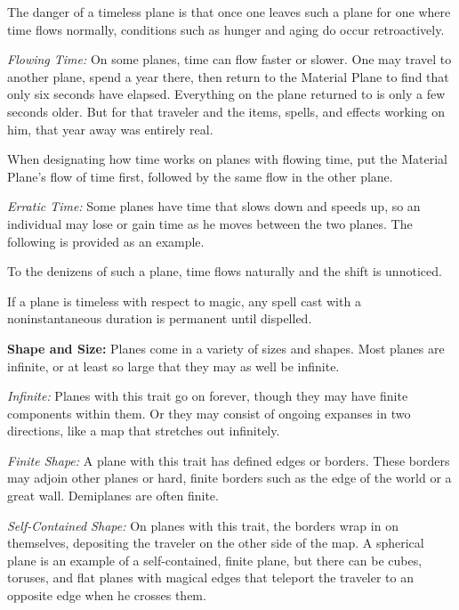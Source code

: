 The danger of a timeless plane is that once one leaves such a plane for one where time flows normally, conditions such as hunger and aging do occur retroactively.

\textit{Flowing Time:} On some planes, time can flow faster or slower. One may travel to another plane, spend a year there, then return to the Material Plane to find that only six seconds have elapsed. Everything on the plane returned to is only a few seconds older. But for that traveler and the items, spells, and effects working on him, that year away was entirely real.

When designating how time works on planes with flowing time, put the Material Plane's flow of time first, followed by the same flow in the other plane.

\textit{Erratic Time:} Some planes have time that slows down and speeds up, so an individual may lose or gain time as he moves between the two planes. The following is provided as an example.


To the denizens of such a plane, time flows naturally and the shift is unnoticed.

If a plane is timeless with respect to magic, any spell cast with a noninstantaneous duration is permanent until dispelled.

\textbf{Shape and Size:} Planes come in a variety of sizes and shapes. Most planes are infinite, or at least so large that they may as well be infinite.

\textit{Infinite:} Planes with this trait go on forever, though they may have finite components within them. Or they may consist of ongoing expanses in two directions, like a map that stretches out infinitely.

\textit{Finite Shape:} A plane with this trait has defined edges or borders. These borders may adjoin other planes or hard, finite borders such as the edge of the world or a great wall. Demiplanes are often finite.

\textit{Self-Contained Shape:} On planes with this trait, the borders wrap in on themselves, depositing the traveler on the other side of the map. A spherical plane is an example of a self-contained, finite plane, but there can be cubes, toruses, and flat planes with magical edges that teleport the traveler to an opposite edge when he crosses them.

